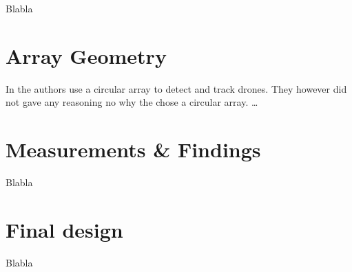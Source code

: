 Blabla
\section{Array Geometry}
In  the authors use a circular array to detect and track drones.
They however did not gave any reasoning no why the chose a circular array.
\dots

\newpage
\section{Measurements \& Findings}
Blabla


\newpage
\section{Final design}
Blabla
